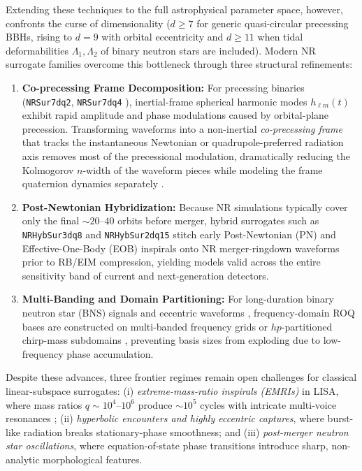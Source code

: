 \documentclass[11pt, a4paper]{article}
\begin{document}
Extending these techniques to the full astrophysical parameter space, however, confronts the curse of dimensionality ($d \ge 7$ for generic quasi-circular precessing BBHs, rising to $d = 9$ with orbital eccentricity and $d \ge 11$ when tidal deformabilities $\Lambda_1, \Lambda_2$ of binary neutron stars are included). Modern NR surrogate families overcome this bottleneck through three structural refinements:
\begin{enumerate}
    \item \textbf{Co-precessing Frame Decomposition:} For precessing binaries (\texttt{NRSur7dq2}, \texttt{NRSur7dq4} \cite{Blackman2017,Varma2019_7dq4}), inertial-frame spherical harmonic modes $h_{\ell m}(t)$ exhibit rapid amplitude and phase modulations caused by orbital-plane precession. Transforming waveforms into a non-inertial \emph{co-precessing frame} that tracks the instantaneous Newtonian or quadrupole-preferred radiation axis removes most of the precessional modulation, dramatically reducing the Kolmogorov $n$-width of the waveform pieces while modeling the frame quaternion dynamics separately \cite{Schmidt2011,Boyle2011}.
    \item \textbf{Post-Newtonian Hybridization:} Because NR simulations typically cover only the final $\sim 20$--$40$ orbits before merger, hybrid surrogates such as \texttt{NRHybSur3dq8} and \texttt{NRHybSur2dq15} \cite{Varma2019_hyb,Yoo2022} stitch early Post-Newtonian (PN) and Effective-One-Body (EOB) inspirals onto NR merger-ringdown waveforms prior to RB/EIM compression, yielding models valid across the entire sensitivity band of current and next-generation detectors.
    \item \textbf{Multi-Banding and Domain Partitioning:} For long-duration binary neutron star (BNS) signals and eccentric waveforms \cite{Islam2021,Tiglio2022}, frequency-domain ROQ bases are constructed on multi-banded frequency grids or $hp$-partitioned chirp-mass subdomains \cite{Vinciguerra2017,Morisaki2021}, preventing basis sizes from exploding due to low-frequency phase accumulation.
\end{enumerate}

Despite these advances, three frontier regimes remain open challenges for classical linear-subspace surrogates: (i) \emph{extreme-mass-ratio inspirals (EMRIs)} in LISA, where mass ratios $q \sim 10^4$--$10^6$ produce $\sim 10^5$ cycles with intricate multi-voice resonances \cite{Chua2021}; (ii) \emph{hyperbolic encounters and highly eccentric captures}, where burst-like radiation breaks stationary-phase smoothness; and (iii) \emph{post-merger neutron star oscillations}, where equation-of-state phase transitions introduce sharp, non-analytic morphological features.
\end{document}
